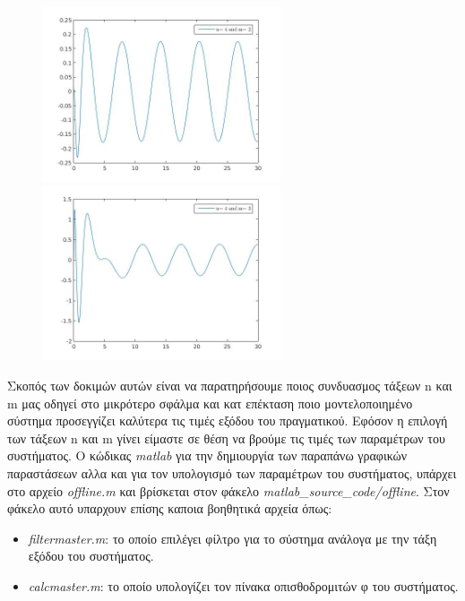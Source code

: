 \documentclass{article}
\begin{document}
 \begin{figure}[h!]
\centering 
 	  \begin{minipage}{0.48\textwidth}
     \centering
     \advance\leftskip-2cm
  \includegraphics[width=70mm,scale=2]{assets/try42.jpg}
   \end{minipage} \hfill
    \begin{minipage}{0.48\textwidth}
  \includegraphics[width=70mm,scale=2]{assets/try43.jpg}
  \end{minipage}
\end{figure}
Σκοπός των δοκιμών αυτών είναι να παρατηρήσουμε ποιος συνδυασμος τάξεων n και m μας οδηγεί στο μικρότερο σφάλμα και κατ επέκταση ποιο μοντελοποιημένο σύστημα προσεγγίζει καλύτερα τις τιμές εξόδου του πραγματικού. Εφόσον η επιλογή των τάξεων n και m γίνει είμαστε σε θέση να βρούμε τις τιμές των παραμέτρων του συστήματος. Ο κώδικας \textit{matlab} για την δημιουργία των παραπάνω γραφικών παραστάσεων αλλα και για τον υπολογισμό των παραμέτρων του συστήματος, υπάρχει στο αρχείο \textit{offline.m} και βρίσκεται στον φάκελο \textit{matlab\_source\_code/offline}. Στον φάκελο αυτό υπαρχουν επίσης καποια βοηθητικά αρχεία όπως:
\begin{itemize}
\item \textit{filtermaster.m}: το οποίο επιλέγει φίλτρο για το σύστημα ανάλογα με την τάξη εξόδου του συστήματος.
\item \textit{calcmaster.m}: το οποίο υπολογίζει τον πίνακα οπισθοδρομιτών φ του συστήματος.
\end{itemize}
\clearpage
\end{document}
